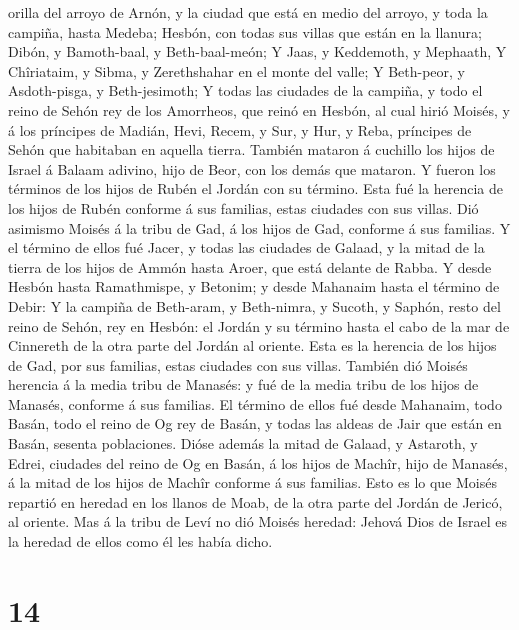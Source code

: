 orilla del arroyo de Arnón, y la ciudad que está en medio del arroyo, y
toda la campiña, hasta Medeba;  Hesbón, con todas sus
villas que están en la llanura; Dibón, y Bamoth-baal, y Beth-baal-meón;
 Y Jaas, y Keddemoth, y Mephaath,  Y
Chîriataim, y Sibma, y Zerethshahar en el monte del valle;
 Y Beth-peor, y Asdoth-pisga, y Beth-jesimoth;
 Y todas las ciudades de la campiña, y todo el reino de
Sehón rey de los Amorrheos, que reinó en Hesbón, al cual hirió Moisés, y
á los príncipes de Madián, Hevi, Recem, y Sur, y Hur, y Reba, príncipes
de Sehón que habitaban en aquella tierra.  También
mataron á cuchillo los hijos de Israel á Balaam adivino, hijo de Beor,
con los demás que mataron.  Y fueron los términos de los
hijos de Rubén el Jordán con su término. Esta fué la herencia de los
hijos de Rubén conforme á sus familias, estas ciudades con sus villas.
 Dió asimismo Moisés á la tribu de Gad, á los hijos de
Gad, conforme á sus familias.  Y el término de ellos fué
Jacer, y todas las ciudades de Galaad, y la mitad de la tierra de los
hijos de Ammón hasta Aroer, que está delante de Rabba.  Y
desde Hesbón hasta Ramathmispe, y Betonim; y desde Mahanaim hasta el
término de Debir:  Y la campiña de Beth-aram, y
Beth-nimra, y Sucoth, y Saphón, resto del reino de Sehón, rey en Hesbón:
el Jordán y su término hasta el cabo de la mar de Cinnereth de la otra
parte del Jordán al oriente.  Esta es la herencia de los
hijos de Gad, por sus familias, estas ciudades con sus villas.
 También dió Moisés herencia á la media tribu de Manasés:
y fué de la media tribu de los hijos de Manasés, conforme á sus
familias.  El término de ellos fué desde Mahanaim, todo
Basán, todo el reino de Og rey de Basán, y todas las aldeas de Jair que
están en Basán, sesenta poblaciones.  Dióse además la
mitad de Galaad, y Astaroth, y Edrei, ciudades del reino de Og en Basán,
á los hijos de Machîr, hijo de Manasés, á la mitad de los hijos de
Machîr conforme á sus familias.  Esto es lo que Moisés
repartió en heredad en los llanos de Moab, de la otra parte del Jordán
de Jericó, al oriente.  Mas á la tribu de Leví no dió
Moisés heredad: Jehová Dios de Israel es la heredad de ellos como él les
había dicho.

\hypertarget{section-13}{%
\section{14}\label{section-13}}

